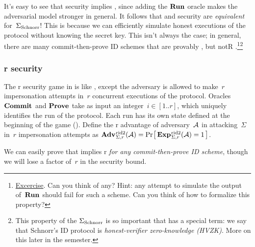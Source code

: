 \documentclass{article}
\newcounter{foot}
\theoremstyle{remark}
\begin{document}
It's easy to see that  security implies , since adding the $\textup{\textbf{Run}}\hspace{0.5pt}$ oracle
makes the adversarial model stronger in general.
%
It follows that  and  security are \emph{equivalent} for~${\Sigma_{\mathrm{Schnorr}}}$!
This is because we can efficiently simulate honest executions of the protocol
without knowing the secret key. This isn't always the case; in general, there
are many commit-then-prove ID schemes that are provably , but notR
.\footnote{\underline{Excercise}. Can you think of any? Hint: any attempt to
simulate the output of~$\textup{\textbf{Run}}\hspace{0.5pt}$ should fail for such a scheme. Can you think of
how to formalize this property?}\footnote{This property of the ${\Sigma_{\mathrm{Schnorr}}}$ is so
important that has a special term: we say that Schnorr's ID protocol is
\emph{honest-verifier zero-knowledge (HVZK)}.  More on this later in the
semester.}

\subsubsection{r security}
The r security game in  is like , except the adversary
is allowed to make~$r$ impersonation attempts in~$r$ concurrent executions of
the protocol. Oracles $\textup{\textbf{Commit}}\hspace{0.5pt}$ and $\textup{\textbf{Prove}}\hspace{0.5pt}$ take as input an
integer~$i\in[1..r]$, which uniquely identifies the run of the protocol.  Each
run has its own state defined at the beginning of the game ().
%
Define the r advantage of adversary~$\mathcal{A}$ in attacking~$\Sigma$ in~$r$
impersonation attempts as
$\Adv{r\id2}_{\Sigma,r}(\A)=\Prob{\Exp{r\id2}_{\Sigma,r}(\A)=1}$.

We can easily prove that implies r \emph{for any commit-then-prove ID
scheme}, though we will lose a factor of~$r$ in the security bound.
\end{document}

